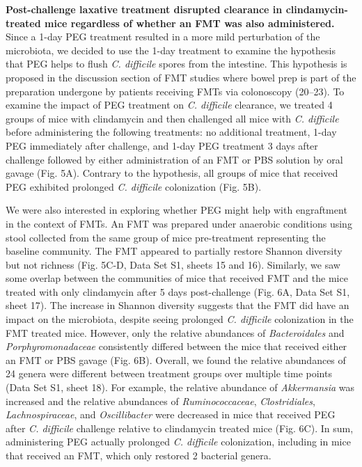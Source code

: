 \documentclass[
  11pt,
]{article}
\begin{document}
\textbf{Post-challenge laxative treatment disrupted clearance in
clindamycin-treated mice regardless of whether an FMT was also
administered.} Since a 1-day PEG treatment resulted in a more mild
perturbation of the microbiota, we decided to use the 1-day treatment to
examine the hypothesis that PEG helps to flush \emph{C. difficile}
spores from the intestine. This hypothesis is proposed in the discussion
section of FMT studies where bowel prep is part of the preparation
undergone by patients receiving FMTs via colonoscopy (20--23). To
examine the impact of PEG treatment on \emph{C. difficile} clearance, we
treated 4 groups of mice with clindamycin and then challenged all mice
with \emph{C. difficile} before administering the following treatments:
no additional treatment, 1-day PEG immediately after challenge, and
1-day PEG treatment 3 days after challenge followed by either
administration of an FMT or PBS solution by oral gavage (Fig. 5A).
Contrary to the hypothesis, all groups of mice that received PEG
exhibited prolonged \emph{C. difficile} colonization (Fig. 5B).

We were also interested in exploring whether PEG might help with
engraftment in the context of FMTs. An FMT was prepared under anaerobic
conditions using stool collected from the same group of mice
pre-treatment representing the baseline community. The FMT appeared to
partially restore Shannon diversity but not richness (Fig. 5C-D, Data
Set S1, sheets 15 and 16). Similarly, we saw some overlap between the
communities of mice that received FMT and the mice treated with only
clindamycin after 5 days post-challenge (Fig. 6A, Data Set S1, sheet
17). The increase in Shannon diversity suggests that the FMT did have an
impact on the microbiota, despite seeing prolonged \emph{C. difficile}
colonization in the FMT treated mice. However, only the relative
abundances of \emph{Bacteroidales} and \emph{Porphyromonadaceae}
consistently differed between the mice that received either an FMT or
PBS gavage (Fig. 6B). Overall, we found the relative abundances of 24
genera were different between treatment groups over multiple time points
(Data Set S1, sheet 18). For example, the relative abundance of
\emph{Akkermansia} was increased and the relative abundances of
\emph{Ruminococcaceae}, \emph{Clostridiales}, \emph{Lachnospiraceae},
and \emph{Oscillibacter} were decreased in mice that received PEG after
\emph{C. difficile} challenge relative to clindamycin treated mice (Fig.
6C). In sum, administering PEG actually prolonged \emph{C. difficile}
colonization, including in mice that received an FMT, which only
restored 2 bacterial genera.
\end{document}
